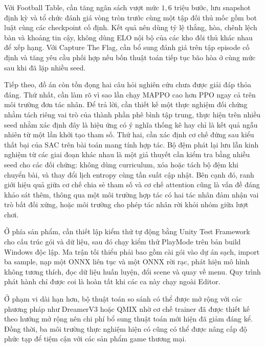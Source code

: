 \indent Với Football Table, cần tăng ngân sách vượt mức $1{,}6$ triệu bước, lưu snapshot
định kỳ và tổ chức đánh giá vòng tròn trước cùng một tập đối thủ mốc gồm bot luật cùng các
checkpoint cố định. Kết quả nên dùng tỷ lệ thắng, hòa, chênh lệch bàn và khoảng tin cậy,
không dùng ELO nội bộ của các kho đối thủ khác nhau để xếp hạng. Với Capture The Flag, cần
bổ sung đánh giá trên tập episode cố định và tăng yêu cầu phối hợp nếu bốn thuật toán tiếp
tục bão hòa ở cùng mức sau khi đã lặp nhiều seed.

\indent Tiếp theo, đồ án còn tồn đọng hai câu hỏi nghiên cứu chưa được giải đáp thỏa đáng.
Thứ nhất, cần làm rõ vì sao lần chạy MAPPO cao hơn PPO ngay cả trên môi
trường đơn tác nhân. Để trả lời, cần thiết kế một thực nghiệm đối chứng nhằm tách riêng
vai trò của thành phần phê bình tập trung, thực hiện trên nhiều seed nhằm xác định
đây là hiệu ứng có ý nghĩa thống kê hay chỉ là kết quả ngẫu nhiên từ một lần khởi tạo
tham số. Thứ hai, cần xác định cơ chế đứng sau kiểu thất bại của SAC trên bài toán mang
tính hợp tác. Bộ đệm phát lại lưu lẫn kinh nghiệm từ các giai đoạn khác nhau là một giả
thuyết cần kiểm tra bằng nhiều seed cho các đối chứng: không dùng curriculum, xóa hoặc tách
bộ đệm khi chuyển bài, và thay đổi lịch entropy cùng tần suất cập nhật. Bên cạnh đó, ranh
giới hiệu quả giữa cơ chế chia sẻ tham số và cơ chế attention
cũng là vấn đề đáng khảo sát thêm, thông qua một môi trường hợp tác có hai tác nhân đảm
nhận vai trò bất đối xứng, hoặc môi trường cho phép tác nhân rời khỏi nhóm giữa lượt chơi.

\indent Ở phía sản phẩm, cần thiết lập kiểm thử tự động bằng Unity Test Framework cho cấu
trúc gói và dữ liệu, sau đó chạy kiểm thử PlayMode trên bản build Windows độc lập. Ma trận
tối thiểu phải bao gồm cài gói vào dự án sạch, import ba sample, nạp một ONNX liên tục và
một ONNX rời rạc, phát hiện mô hình không tương thích, đọc dữ liệu huấn luyện, đổi scene và
quay về menu. Quy trình phát hành chỉ được coi là hoàn tất khi các ca này chạy ngoài Editor.

\indent Ở phạm vi dài hạn hơn, bộ thuật toán so sánh có thể được mở rộng với các phương
pháp như DreamerV3 hoặc QMIX nhờ cơ chế trainer đã được thiết kế theo hướng mở rộng nên
chi phí bổ sung thuật toán mới hiện đã giảm đáng kể. Đồng thời, ba môi trường thực nghiệm
hiện có cũng có thể được nâng cấp độ phức tạp để tiệm cận với các sản phẩm game thương
mại. 
